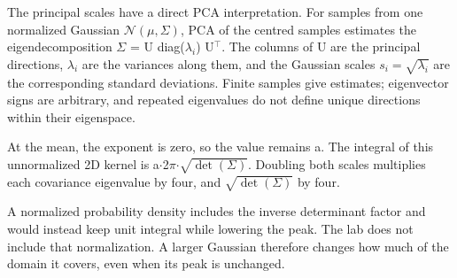 \documentclass[11pt,a4paper]{article}
\begin{document}
The principal scales have a direct PCA interpretation.
For samples from one normalized Gaussian $\mathcal N(\mu,\Sigma)$, PCA of the centred samples estimates the eigendecomposition $\Sigma$ = U diag($\lambda$${}_i$) U${}^\top$.
The columns of U are the principal directions, $\lambda$${}_i$ are the variances along them, and the Gaussian scales $s_i=\sqrt{\lambda_i}$ are the corresponding standard deviations.
Finite samples give estimates; eigenvector signs are arbitrary, and repeated eigenvalues do not define unique directions within their eigenspace.

At the mean, the exponent is zero, so the value remains a.
The integral of this unnormalized 2D kernel is a$\cdot$2$\pi$$\cdot$$\sqrt{\det(\Sigma)}$.
Doubling both scales multiplies each covariance eigenvalue by four, and $\sqrt{\det(\Sigma)}$ by four.

A normalized probability density includes the inverse determinant factor and would instead keep unit integral while lowering the peak.
The lab does not include that normalization.
A larger Gaussian therefore changes how much of the domain it covers, even when its peak is unchanged.
\end{document}
